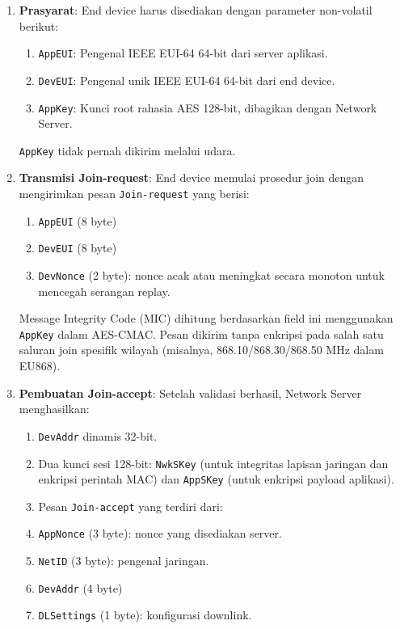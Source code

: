 \begin{enumerate}
    \item \textbf{Prasyarat}: End device harus disediakan dengan parameter non-volatil berikut:
          \begin{enumerate}
              \item \texttt{AppEUI}: Pengenal IEEE EUI-64 64-bit dari server aplikasi.
              \item \texttt{DevEUI}: Pengenal unik IEEE EUI-64 64-bit dari end device.
              \item \texttt{AppKey}: Kunci root rahasia AES 128-bit, dibagikan dengan Network Server.
          \end{enumerate}
          \texttt{AppKey} tidak pernah dikirim melalui udara.
    \item \textbf{Transmisi Join-request}: End device memulai prosedur join dengan mengirimkan pesan \texttt{Join-request} yang berisi:
          \begin{enumerate}
              \item \texttt{AppEUI} (8 byte)
              \item \texttt{DevEUI} (8 byte)
              \item \texttt{DevNonce} (2 byte): nonce acak atau meningkat secara monoton untuk mencegah serangan replay.
          \end{enumerate}
          Message Integrity Code (MIC) dihitung berdasarkan field ini menggunakan \texttt{AppKey} dalam AES-CMAC. Pesan dikirim tanpa enkripsi pada salah satu saluran join spesifik wilayah (misalnya, 868.10/868.30/868.50 MHz dalam EU868).
    \item \textbf{Pembuatan Join-accept}: Setelah validasi berhasil, Network Server menghasilkan:
          \begin{enumerate}
              \item \texttt{DevAddr} dinamis 32-bit.
              \item Dua kunci sesi 128-bit: \texttt{NwkSKey} (untuk integritas lapisan jaringan dan enkripsi perintah MAC) dan \texttt{AppSKey} (untuk enkripsi payload aplikasi).
              \item Pesan \texttt{Join-accept} yang terdiri dari:
              \item \texttt{AppNonce} (3 byte): nonce yang disediakan server.
              \item \texttt{NetID} (3 byte): pengenal jaringan.
              \item \texttt{DevAddr} (4 byte)
              \item \texttt{DLSettings} (1 byte): konfigurasi downlink.

\end{enumerate}
\end{enumerate}
